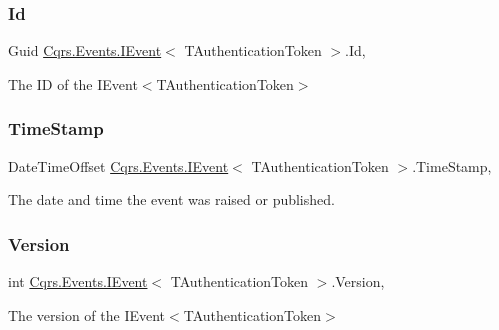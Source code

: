 \subsubsection{\texorpdfstring{Id}{Id}}
{\footnotesize\ttfamily Guid \hyperlink{interfaceCqrs_1_1Events_1_1IEvent}{Cqrs.\+Events.\+I\+Event}$<$ T\+Authentication\+Token $>$.Id\hspace{0.3cm}{\ttfamily [get]}, {\ttfamily [set]}}



The ID of the I\+Event$<$\+T\+Authentication\+Token$>$ 

\mbox{\label{interfaceCqrs_1_1Events_1_1IEvent_a149d6ea1652cbcc63dbc45eaa71fade0_a149d6ea1652cbcc63dbc45eaa71fade0}} 
\subsubsection{\texorpdfstring{Time\+Stamp}{TimeStamp}}
{\footnotesize\ttfamily Date\+Time\+Offset \hyperlink{interfaceCqrs_1_1Events_1_1IEvent}{Cqrs.\+Events.\+I\+Event}$<$ T\+Authentication\+Token $>$.Time\+Stamp\hspace{0.3cm}{\ttfamily [get]}, {\ttfamily [set]}}



The date and time the event was raised or published. 

\mbox{\label{interfaceCqrs_1_1Events_1_1IEvent_a2754e056f483b9a8e59622a363276b15_a2754e056f483b9a8e59622a363276b15}} 
\subsubsection{\texorpdfstring{Version}{Version}}
{\footnotesize\ttfamily int \hyperlink{interfaceCqrs_1_1Events_1_1IEvent}{Cqrs.\+Events.\+I\+Event}$<$ T\+Authentication\+Token $>$.Version\hspace{0.3cm}{\ttfamily [get]}, {\ttfamily [set]}}



The version of the I\+Event$<$\+T\+Authentication\+Token$>$ 

